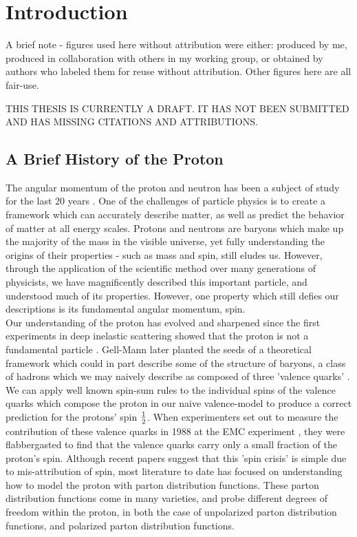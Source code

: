 \chapter{Introduction}

A brief note - figures used here without attribution were either: produced by
me, produced in collaboration with others in my working group, or obtained by
authors who labeled them for reuse without attribution. Other figures here are
all fair-use.

THIS THESIS IS CURRENTLY A DRAFT. IT HAS NOT BEEN SUBMITTED AND HAS MISSING
CITATIONS AND ATTRIBUTIONS. 

\section{A Brief History of the Proton}
The angular momentum of the proton and neutron has been a subject of study for
the last 20 years \needcite{}. One of the challenges of particle physics is to
create a framework which can accurately describe matter, as well as predict the
behavior of matter at all energy scales. Protons and neutrons are baryons which
make up the majority of the mass in the visible universe, yet fully
understanding the origins of their properties - such as  mass and spin, still
eludes us. However, through the application of the scientific method over many
generations of physicists, we have magnificently described this important
particle, and understood much of its properties. However, one property which
still defies our descriptions is its fundamental angular momentum, spin. \\
	
Our understanding of the proton has evolved and sharpened since the first
experiments in deep inelastic scattering showed that the proton is not a
fundamental particle \cite{Breidenbach1969}. Gell-Mann later planted the seeds
of a theoretical framework which could in part describe some of the structure of
baryons, a class of hadrons which we may naively describe as composed of three
'valence quarks' \needcite{}. We can apply well known spin-sum rules to the
individual spins of the valence quarks which compose the proton in our naive
valence-model to produce a correct prediction for the protons' spin
${1}\over{2}$. When experimenters set out to measure the contribution of these
valence quarks in 1988 at the EMC experiment \cite{Ashman1988}, they were
flabbergasted to find that the valence quarks carry only a small fraction of the
proton's spin. Although recent papers \cite{Povh2016} suggest that this 'spin
crisis' is simple due to mis-attribution of spin, most literature to date has
focused on understanding how to model the proton with parton distribution
functions. These parton distribution functions come in many varieties, and probe
different degrees of freedom within the proton, in both the case of unpolarized
parton distribution functions, and polarized parton distribution functions. \\
 
